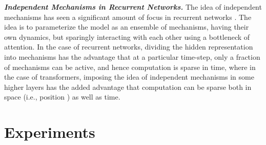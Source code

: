 \documentclass{article}
\begin{document}
{\bfseries \itshape Independent Mechanisms in Recurrent Networks. } The idea of independent  mechanisms has seen a significant amount of focus in recurrent networks \citep{goyal2019recurrent}. The idea is to parameterize the model as an ensemble of mechanisms, having their own dynamics, but sparingly interacting with each other using a bottleneck of attention. In the case of recurrent networks, dividing the hidden representation into mechanisms has the advantage that at a particular time-step, only a fraction of mechanisms can be active, and hence computation is sparse in time, where in the case of transformers, imposing the idea of independent mechanisms in some higher layers has the added advantage that computation can be sparse both in space (i.e., position ) as well as time. 



\vspace{-2mm}
\section{Experiments}
\end{document}
